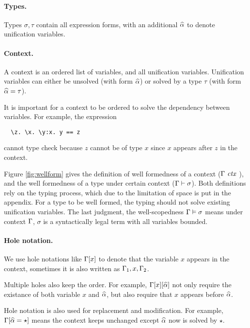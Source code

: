 \paragraph{Types.} Types $\sigma, \tau$ contain all expression forms, with an
additional $\widehat{\alpha}$ to denote unification variables.

\paragraph{Context.} A context is an ordered list of variables, and all
unification variables.
Unification variables can either be unsolved
(with form $\widehat{\alpha}$) or solved by a type $\tau$ (with form $\widehat{\alpha} = \tau$).

It is important for a context to be ordered to solve the dependency between
variables.
For example, the expression

\begin{lstlisting}
  \z. \x. \y:x. y == z
\end{lstlisting}

\noindent cannot type check because $z$ cannot be of type $x$ since $x$
appears after $z$ in the context.

Figure \ref{fig:wellform} gives the definition of well formedness of a context
($\Gamma \ \mathit{ctx}\ $),
and the well formedness of
a type under certain context ($\Gamma \vdash \sigma$).
Both definitions rely on the typing process,
which due to the limitation of space is put in the appendix.
For a type to be well formed, the typing should not solve existing unification
variables.
The last judgment, the
well-scopedness
$\Gamma \vDash \sigma$ means under context $\Gamma$, $\sigma$ is a syntactically
legal term with all variables bounded.

\paragraph{Hole notation.} We use hole notations like $\Gamma[x]$ to
denote that the variable $x$ appears in the context, sometimes it is also
written as $\Gamma_1, x, \Gamma_2$.

Multiple holes also keep the order. For example, $\Gamma[x][\widehat{\alpha}]$ not only
require the existance of both variable $x$ and $\widehat{\alpha}$, but also require that
$x$ appears before $\widehat{\alpha}$.

Hole notation is also used for replacement and modification. For example,
$\Gamma[\widehat{\alpha} = \star]$ means the context keeps unchanged except $\widehat{\alpha}$
now is solved by $\star$.

